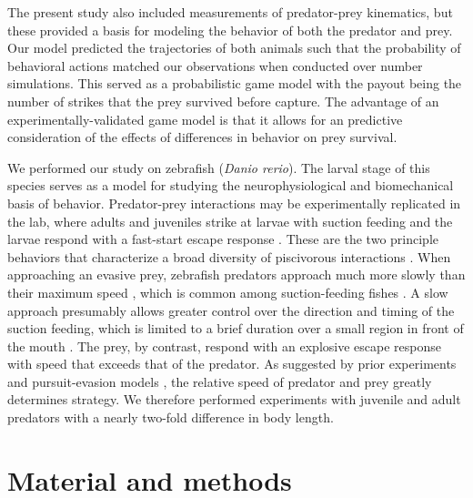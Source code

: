 \documentclass[]{rsos}%
\begin{document}
The present study also included measurements of predator-prey kinematics, but these provided a basis for modeling the behavior of both the predator and prey.
Our model predicted the trajectories of both animals such that the probability of behavioral actions matched our observations when conducted over number simulations.
This served as a probabilistic game model with the payout being the number of strikes that the prey survived before capture.
The advantage of an experimentally-validated game model is that it allows for an predictive consideration of the effects of differences in behavior on prey survival.

We performed our study on zebrafish (\textit{Danio rerio}). 
The larval stage of this species serves as a model for studying the neurophysiological \cite{Bianco:2015gm,Bagnall:2014iu,Huang:2013vj} and biomechanical \cite{Muller:2004hp,Li:2016cy} basis of behavior.
Predator-prey interactions may be experimentally replicated in the lab, where adults and juveniles strike at larvae with suction feeding and the larvae respond with a fast-start escape response \cite{Stewart:2013bha}.
These are the two principle behaviors that characterize a broad diversity of piscivorous interactions \cite{Weihs:1984tb,Walker:2005vn}. 
When approaching an evasive prey, zebrafish predators approach much more slowly than their maximum speed \cite{Stewart:2013bha}, which is common among suction-feeding fishes \cite{Webb:1984jz,Higham:2007go}.
A slow approach presumably allows greater control over the direction and timing of the suction feeding, which is limited to a brief duration over a small region in front of the mouth \cite{Holzman:2008jc,Holzman:2009uu}. 
The prey, by contrast, respond with an explosive escape response with speed that exceeds that of the predator. 
As suggested by prior experiments \cite{Fuiman:1994td} and pursuit-evasion models \cite{Weihs:1984tb}, the relative speed of predator and prey greatly determines strategy.
We therefore performed experiments with juvenile and adult predators with a nearly two-fold difference in body length.


\section{Material and methods}
\end{document}
